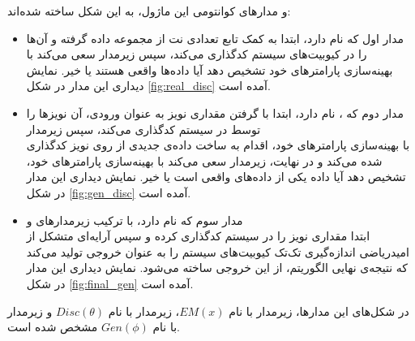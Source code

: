 و مدارهای کوانتومی این ماژول، به این شکل ساخته شده‌اند:
\begin{itemize}
    \item
    مدار اول که
    نام دارد،
    ابتدا به کمک تابع
    تعدادی نت از مجموعه داده گرفته و آن‌ها را در کیوبیت‌های سیستم کدگذاری می‌کند، سپس زیرمدار
    سعی می‌کند با بهینه‌سازی پارامترهای خود تشخیص دهد آیا داده‌ها واقعی هستند یا خیر.
    نمایش دیداری این مدار در شکل 
    \ref{fig:real_disc}
    آمده است.
    
    \item
    مدار دوم که
    ،
    نام دارد، ابتدا با گرفتن مقداری نویز به عنوان ورودی، آن نویزها را توسط
    در سیستم کدگذاری می‌کند، سپس زیرمدار \\
    با بهینه‌سازی پارامترهای خود، اقدام به ساخت داده‌ی جدیدی از روی نویز کدگذاری شده می‌کند و در نهایت، زیرمدار
    سعی می‌کند با بهینه‌سازی پارامترهای خود، تشخیص دهد آیا داده یکی از داده‌های واقعی است یا خیر.
    نمایش دیداری این مدار در شکل 
    \ref{fig:gen_disc}
    آمده است.
    
    \item
    مدار سوم که
    نام دارد، با ترکیب زیرمدار‌های
    و \\
    ابتدا مقداری نویز را در سیستم کدگذاری کرده و سپس آرایه‌ای متشکل از امیدریاضی اندازه‌گیری تک‌تک کیوبیت‌های سیستم را به عنوان خروجی تولید می‌کند که نتیجه‌ی نهایی الگوریتم، از این خروجی ساخته می‌شود.
    نمایش دیداری این مدار در شکل 
    \ref{fig:final_gen}
    آمده است.
    
\end{itemize}

در شکل‌های این مدارها، زیرمدار
با نام
$EM(x)$،
زیرمدار
با نام
$Disc(\theta)$
و زیرمدار
با نام
$Gen(\phi)$
مشخص شده است.



